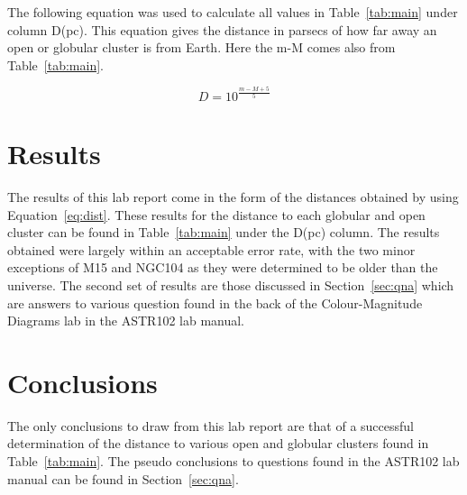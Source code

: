 \documentclass{article}
\begin{document}
The following equation was used to calculate all values in Table~\ref{tab:main} under
column D(pc). This equation gives the distance in parsecs of how far away an open or
globular cluster is from Earth. Here the m-M comes also from Table~\ref{tab:main}.

\begin{equation}
\label{eq:dist}
D = 10^{\frac{m-M+5}{5}}
\end{equation}




\section{Results}

The results of this lab report come in the form of the distances obtained by using
Equation~\ref{eq:dist}. These results for the distance to each globular and open cluster
can be found in Table~\ref{tab:main} under the D(pc) column. The results obtained were
largely within an acceptable error rate, with the two minor exceptions of
M15 and NGC104 as they were determined to be older than the universe. The second set
of results are those discussed in Section~\ref{sec:qna} which are answers to various
question found in the back of the Colour-Magnitude Diagrams lab in the ASTR102 lab
manual.




\section{Conclusions}

The only conclusions to draw from this lab report are that of a successful determination
of the distance to various open and globular clusters found in Table~\ref{tab:main}. The
pseudo conclusions to questions found in the ASTR102 lab manual can be found in
Section~\ref{sec:qna}.

\end{document}
